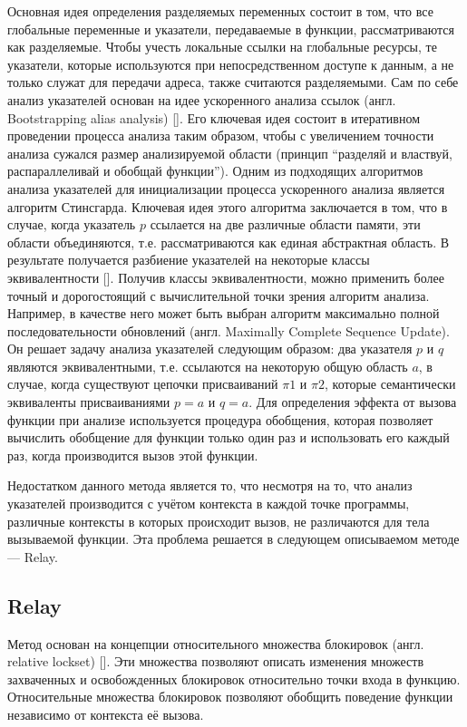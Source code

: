 Основная идея определения разделяемых переменных состоит в том, что все глобальные переменные и указатели, передаваемые в функции, рассматриваются как разделяемые. Чтобы учесть локальные ссылки на глобальные ресурсы, те указатели, которые используются при непосредственном доступе к данным, а не только служат для передачи адреса, также считаются разделяемыми. Сам по себе анализ указателей основан на идее ускоренного анализа ссылок (англ. Bootstrapping alias analysis) []. Его ключевая идея состоит в итеративном проведении процесса анализа таким образом, чтобы с увеличением точности анализа сужался размер анализируемой области (принцип “разделяй и властвуй, распараллеливай и обобщай функции”). Одним из подходящих алгоритмов анализа указателей для инициализации процесса ускоренного анализа  является алгоритм Стинсгарда. Ключевая идея этого алгоритма заключается в том, что в случае, когда указатель $p$ ссылается на две различные области памяти, эти области объединяются, т.е. рассматриваются как единая абстрактная область. В результате получается разбиение указателей на некоторые классы эквивалентности []. Получив классы эквивалентности, можно применить более точный и дорогостоящий с вычислительной точки зрения алгоритм анализа. Например, в качестве него может быть выбран алгоритм максимально полной последовательности обновлений (англ. Maximally Complete Sequence Update). Он решает задачу анализа указателей следующим образом: два указателя $p$ и $q$ являются эквивалентными, т.е. ссылаются на некоторую общую область $a$, в случае, когда существуют цепочки присваиваний $\pi1$ и $\pi2$, которые семантически эквиваленты присваиваниями $p=a$ и $q=a$.  Для определения эффекта от вызова функции при анализе используется процедура обобщения, которая позволяет вычислить обобщение для функции только один раз и использовать его каждый раз, когда производится вызов этой функции.

Недостатком данного метода является то, что несмотря на то, что анализ указателей производится с учётом контекста в каждой точке программы, различные контексты в которых происходит вызов, не различаются для тела вызываемой функции. Эта проблема решается в следующем описываемом методе — Relay.

\subsection{Relay}

Метод основан на концепции относительного множества блокировок (англ. relative lockset) []. Эти множества позволяют описать изменения множеств захваченных и освобожденных блокировок относительно точки входа в функцию. Относительные множества блокировок позволяют обобщить поведение функции независимо от контекста её вызова.

